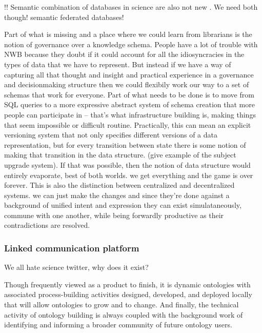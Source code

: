 \documentclass[10pt]{article}
\begin{document}
\begin{multicols}{2}
!! Semantic combination of databases in science are also not new \cite{cheungSemanticWebApproach2007, simaEnablingSemanticQueries2019} .
We need both though! semantic federated databases!

Part of what is missing and a place where we could learn from librarians
is the notion of governance over a knowledge schema. People have a lot
of trouble with NWB because they doubt if it could account for all the
idiosyncracies in the types of data that we have to represent. But
instead if we have a way of capturing all that thought and insight and
practical experience in a governance and decisionmaking structure then
we could flexibily work our way to a set of schemas that work for
everyone. Part of what needs to be done is to move from SQL queries to a
more expressive abstract system of schema creation that more people can
participate in -- that's what infrastructure building is, making things
that seem impossible or difficult routine. Practically, this can mean an
explicit versioning system that not only specifies different versions of
a data representation, but for every transition between state there is
some notion of making that transition in the data structure. (give
example of the subject upgrade system). If that was possible, then the
notion of data structure would entirely evaporate, best of both worlds.
we get everything and the game is over forever. This is also the
distinction between centralized and decentralized systems. we can just
make the changes and since they're done against a background of unified
intent and expression they can exist simulataneously, commune with one
another, while being forwardly productive as their contradictions are
resolved.

\hypertarget{linked-communication-platform}{%
\subsubsection{Linked communication
platform}\label{linked-communication-platform}}

We all hate science twitter, why does it exist?

\begin{leftbar}
Though frequently viewed as a product to finish, it is dynamic
ontologies with associated process-building activities designed,
developed, and deployed locally that will allow ontologies to grow and
to change. And finally, the technical activity of ontology building is
always coupled with the background work of identifying and informing a
broader community of future ontology users. \cite{bowkerInformationInfrastructureStudies2010} 
\end{leftbar}


\end{multicols}
\end{document}
